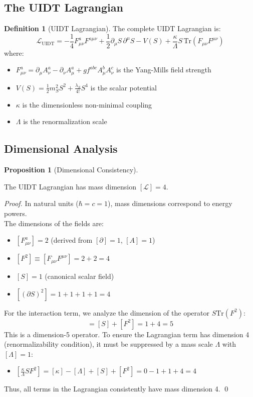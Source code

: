 \documentclass[11pt,a4paper]{article}
\providecommand{\Lagr}{\mathcal{L}}
\renewcommand{\Tr}{\mathrm{Tr}}
\theoremstyle{plain}
\newtheorem{proposition}[theorem]{Proposition}
\theoremstyle{definition}
\newtheorem{definition}[theorem]{Definition}
\begin{document}
\subsection{The UIDT Lagrangian}

\begin{definition}[UIDT Lagrangian]
\label{def:lagrangian}
The complete UIDT Lagrangian is:
\begin{equation}
\Lagr_{\mathrm{UIDT}} = -\frac{1}{4}F^a_{\mu\nu}F^{a\mu\nu}
+ \frac{1}{2}\partial_\mu S\,\partial^\mu S
- V(S)
+ \frac{\kappa}{\Lambda}S\,\Tr(F_{\mu\nu}F^{\mu\nu})
\label{eq:uidt_lagrangian}
\end{equation}
where:
\begin{itemize}
\item $F^a_{\mu\nu} = \partial_\mu A^a_\nu - \partial_\nu A^a_\mu + g f^{abc} A^b_\mu A^c_\nu$ is the Yang-Mills field strength
\item $V(S) = \frac{1}{2}m_S^2 S^2 + \frac{\lambda_S}{4!}S^4$ is the scalar potential
\item $\kappa$ is the dimensionless non-minimal coupling
\item $\Lambda$ is the renormalization scale
\end{itemize}
\end{definition}

\subsection{Dimensional Analysis}

\begin{proposition}[Dimensional Consistency]
\end{proposition}
\label{prop:dimensions}
The UIDT Lagrangian has mass dimension $[\Lagr] = 4$.
\begin{proof}
In natural units ($\hbar = c = 1$), mass dimensions correspond to energy powers.
\\ The dimensions of the fields are:
\vspace{0.2em}
\begin{itemize}
\item $[F^a_{\mu\nu}] = 2$ (derived from $[\partial] = 1$, $[A] = 1$)
\item $[F^2] \equiv [F_{\mu\nu} F^{\mu\nu}] = 2 + 2 = 4$
\item $[S] = 1$ (canonical scalar field)
\item $[(\partial S)^2] = 1 + 1 + 1 + 1 = 4$
\end{itemize}
For the interaction term, we analyze the dimension of the operator $S \Tr(F^2)$:
\begin{equation}
[S \Tr(F^2)] = [S] + [F^2] = 1 + 4 = 5
\end{equation}
This is a dimension-5 operator. To ensure the Lagrangian term has dimension 4 (renormalizability condition), it must be suppressed by a mass scale $\Lambda$ with $[\Lambda]=1$:
\begin{itemize}
\item $[\frac{\kappa}{\Lambda} S F^2] = [\kappa] - [\Lambda] + [S] + [F^2] = 0 - 1 + 1 + 4 = 4$
\end{itemize}
Thus, all terms in the Lagrangian consistently have mass dimension 4. \qed
\end{proof}
\end{document}
